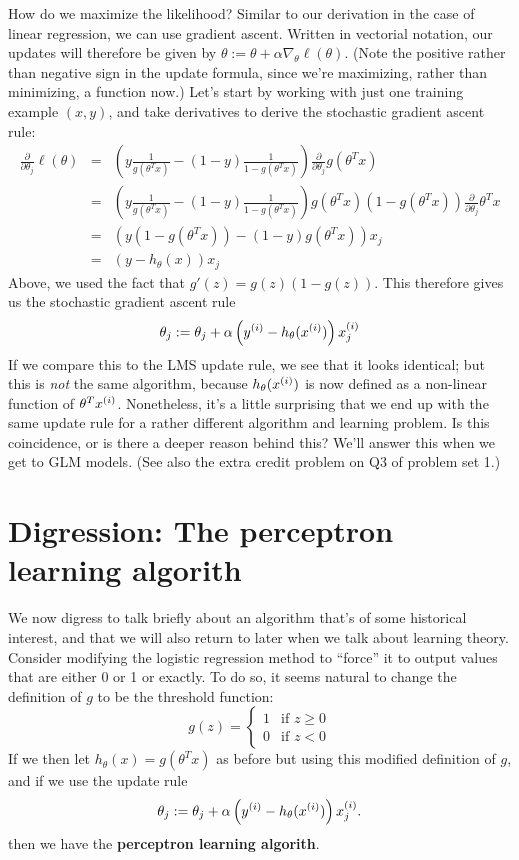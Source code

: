 \documentclass{article}
\begin{document}
How do we maximize the likelihood?  Similar to our derivation in the case
of linear regression, we can use gradient ascent.  Written in vectorial
notation, our updates will therefore be given by
$\theta := \theta + \alpha \nabla_\theta \ell(\theta)$.  (Note the
positive rather than negative sign in the update formula, since we're maximizing, rather
than minimizing, a function now.)  Let's start by working with just
one training example $(x,y)$, and take derivatives to derive the stochastic
gradient ascent rule:
\begin{eqnarray*}
\frac{\partial}{\partial \theta_j} \ell(\theta) &=&
\left(y \frac{1}{g(\theta^Tx)} - (1-y) \frac{1}{1-g(\theta^Tx)}\right)
\frac{\partial}{\partial \theta_j} g(\theta^Tx) \\
&=& \left(y \frac{1}{g(\theta^Tx)} - (1-y) \frac{1}{1-g(\theta^Tx)}\right)
g(\theta^Tx)(1-g(\theta^Tx))
\frac{\partial}{\partial \theta_j} \theta^Tx \\
&=& \left(y (1-g(\theta^Tx)) - (1-y) g(\theta^Tx) \right) x_j \\
&=& \left(y - h_\theta(x) \right) x_j
\end{eqnarray*}
Above, we used the fact that $g'(z) = g(z)(1-g(z))$. This therefore gives
us the stochastic gradient ascent rule
\[
\theta_j := \theta_j + \alpha \left({y^{(i)}} - h_\theta({x^{(i)}})\right) x^{(i)}_j
\]
If we compare this to the LMS update rule, we see that it looks identical;
but this is \emph{not} the same algorithm, because $h_\theta({x^{(i)}})$ is now
defined as a non-linear function of $\theta^T{x^{(i)}}$.  Nonetheless, it's a little
surprising that we end up with the same update rule for a rather different
algorithm and learning problem.  Is this coincidence, or is there a deeper
reason behind this?  We'll answer this when we get to GLM models.  (See also
the extra credit problem on Q3 of problem set 1.)

\section{Digression: The perceptron learning algorith\nexp}

We now digress to talk briefly about an algorithm that's
of some historical interest, and that we will also return to later when
we talk about learning theory.  Consider
modifying the logistic regression method to ``force'' it to output values
that are either 0 or 1 or exactly.  To do so, it seems natural to change the definition
of $g$ to be the threshold function:
\[
 g(z) = \left\{\begin{array}{ll}
 1  & \mbox{if~} z \geq 0 \\
 0  & \mbox{if~} z < 0
\end{array} \right.
\]
If we then let $h_\theta(x) = g(\theta^Tx)$ as before but using this
modified definition of $g$, and if we use the update rule
\[
\theta_j := \theta_j + \alpha \left({y^{(i)}} - h_\theta({x^{(i)}})\right) x^{(i)}_j.
\]
then we have the {\bf perceptron learning algorith\nexp}.
\end{document}

